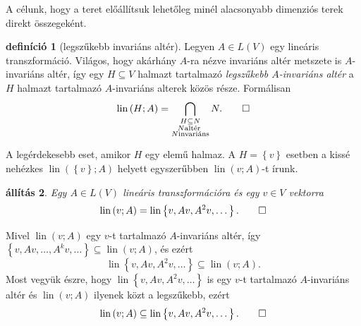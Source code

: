 \documentclass[a4paper, showtrims]{memoir}
\makeatletter
\renewenvironment{proof}[1][\proofname]
    {\par\pushQED{\qed}%
    \normalfont \topsep6\p@\@plus6\p@\relax
    \trivlist
    \item[\hskip\labelsep
        \itshape
    #1\@addpunct{:}]\ignorespaces}
    {\popQED\endtrivlist\@endpefalse}
\theoremstyle{plain}
\newtheorem{proposition}{állítás}[chapter]
\theoremstyle{remark}
\theoremstyle{definition}
\newtheorem{definition}[proposition]{definíció}
\DeclareMathOperator{\lin}{lin}
\makeatother
\begin{document}
A célunk, hogy a teret előállítsuk lehetőleg minél alacsonyabb dimenziós terek direkt összegeként.

\begin{definition}[legszűkebb invariáns altér]
	Legyen $A\in L\left( V \right)$ egy lineáris transzformáció.
	Világos, hogy akárhány $A$-ra nézve invariáns altér metszete is $A$-invariáns altér,
	így egy $H\subseteq V$ halmazt tartalmazó
	\emph{legszűkebb $A$-invariáns altér}
	a $H$ halmazt tartalmazó $A$-invariáns alterek közös része.
	Formálisan
	\[
		\lin\left( H;A \right)
		=
		\bigcap_{
			\substack{
				H\subseteq N\\
				N\text{altér }\\
				N\text{invariáns}}
		}N.\qedhere
	\]
\end{definition}
A legérdekesebb eset, amikor $H$ egy elemű halmaz.
A $H=\left\{ v \right\}$ esetben a kissé nehézkes
$\lin\left( \left\{ v \right\};A \right)$ helyett egyszerűbben $\lin\left( v;A \right)$-t írunk.

\begin{proposition}
	Egy $A\in L\left( V \right)$ lineáris transzformációra és egy $v\in V$ vektorra
	\[
		\lin\left( v;A \right)
		=
		\lin\left\{ v,Av,A^2v,\dots \right\}.\qedhere
	\]
\end{proposition}
\begin{proof}
	Mivel $\lin\left( v;A \right)$ egy $v$-t tartalmazó $A$-invariáns altér,
	így $\left\{ v,Av,\ldots,A^kv,\dots \right\}\subseteq \lin\left( v;A \right)$,
	és ezért
	\[
		\lin\left\{ v,Av,A^2v,\dots \right\}
		\subseteq
		\lin\left( v;A \right).
	\]
	Most vegyük észre, hogy
	\begin{math}
		\lin\left\{ v,Av,A^2v,\dots \right\}
	\end{math}
	is egy $v$-t tartalmazó $A$-invariáns altér és $\lin\left( v;A \right)$ ilyenek közt a legszűkebb, ezért
	\[
		\lin\left( v;A \right)
		\subseteq
		\lin\left\{ v,Av,A^2v,\dots \right\}.\qedhere
	\]
\end{proof}
\end{document}
